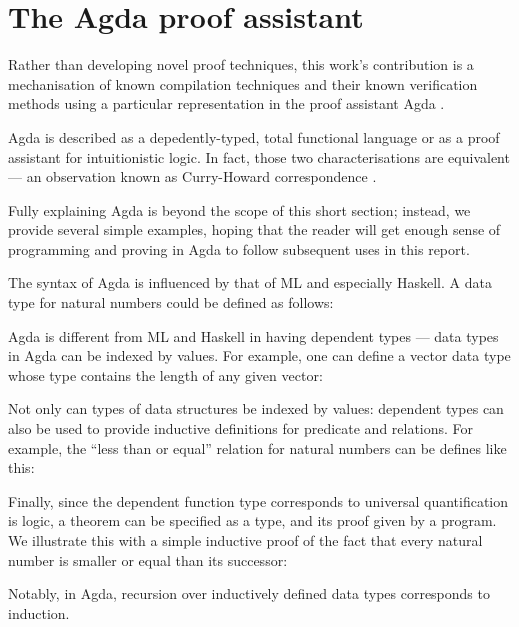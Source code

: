 \documentclass[bsc,frontabs,oneside,singlespacing,parskip,deptreport]{infthesis}
\theoremstyle{definition}
\theoremstyle{lemma}
\begin{document}
\section{The Agda proof assistant}
\label{sec:agda-proof-assistant}

Rather than developing novel proof techniques, this work's
contribution is a mechanisation of known compilation techniques and
their known verification methods using a particular representation in
the proof assistant Agda \cite{DBLP:conf/afp/Norell08}.

Agda is described as a depedently-typed, total functional language or
as a proof assistant for intuitionistic logic. In fact, those two
characterisations are equivalent --- an observation known as
Curry-Howard correspondence \cite{DBLP:journals/cacm/Wadler15}.

Fully explaining Agda is beyond the scope of this short section;
instead, we provide several simple examples, hoping that the reader
will get enough sense of programming and proving in Agda to follow
subsequent uses in this report.

The syntax of Agda is influenced by that of ML and especially
Haskell. A data type for natural numbers could be defined as follows:


Agda is different from ML and Haskell in having dependent types --- data
types in Agda can be indexed by values. For example, one can define a
vector data type whose type contains the length of any given vector:


Not only can types of data structures be indexed by values: dependent
types can also be used to provide inductive definitions for predicate
and relations. For example, the ``less than or equal'' relation for
natural numbers can be defines like this:


Finally, since the dependent function type corresponds to universal
quantification is logic, a theorem can be specified as a type, and its
proof given by a program. We illustrate this with a simple inductive
proof of the fact that every natural number is smaller or equal than
its successor:


Notably, in Agda, recursion over inductively defined data types
corresponds to induction.
\end{document}
